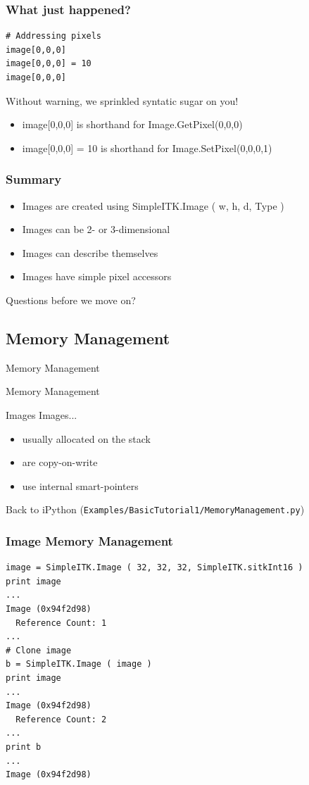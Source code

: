 \begin{frame}[fragile]
\frametitle{What just happened?}
\lstpython
\begin{lstlisting}
# Addressing pixels
image[0,0,0]
image[0,0,0] = 10
image[0,0,0]
\end{lstlisting}
Without warning, we sprinkled syntatic sugar on you!
\begin{itemize}
  \item image[0,0,0] is shorthand for Image.GetPixel(0,0,0)
  \item image[0,0,0] = 10 is shorthand for Image.SetPixel(0,0,0,1)
\end{itemize}
\end{frame}

\begin{frame}[fragile]
\frametitle{Summary}
\begin{itemize}
  \item Images are created using SimpleITK.Image ( w, h, d, Type )
  \item Images can be 2- or 3-dimensional
  \item Images can describe themselves
  \item Images have simple pixel accessors
\end{itemize}
Questions before we move on?
\end{frame}

\subsection{Memory Management}

\begin{frame}{Memory Management}
\fontsize{36pt}{36pt}\selectfont
\center
\begin{center}
Memory Management
\end{center}
\end{frame}


\begin{frame}{Images}
Images...
\begin{itemize}
  \item usually allocated on the stack
  \item are copy-on-write
  \item use internal smart-pointers
\end{itemize}
Back to iPython (\texttt{Examples/BasicTutorial1/MemoryManagement.py})
\end{frame}

\begin{frame}[fragile]
\frametitle{Image Memory Management}
\lstpython
\begin{lstlisting}
image = SimpleITK.Image ( 32, 32, 32, SimpleITK.sitkInt16 )
print image
...
Image (0x94f2d98)
  Reference Count: 1
...
# Clone image
b = SimpleITK.Image ( image )
print image
...
Image (0x94f2d98)
  Reference Count: 2
...
print b
...
Image (0x94f2d98)
\end{lstlisting}
\end{frame}

